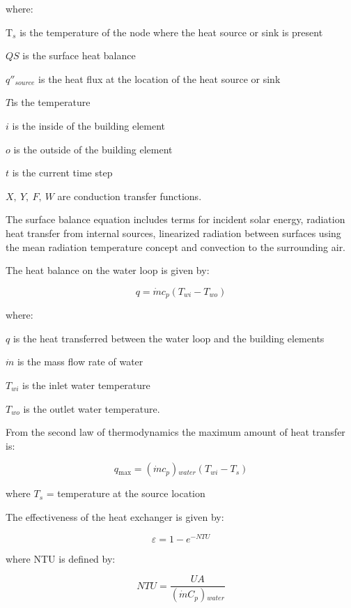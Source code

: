 where:

T\(_{s}\) is the temperature of the node where the heat source or sink is present

\(QS\) is the surface heat balance

\({q''_{source}}\) is the heat flux at the location of the heat source or sink

\(T\)is the temperature

\(i\) is the inside of the building element

\(o\) is the outside of the building element

\(t\) is the current time step

\(X,~Y,~F,~W\) are conduction transfer functions.

The surface balance equation includes terms for incident solar energy, radiation heat transfer from internal sources, linearized radiation between surfaces using the mean radiation temperature concept and convection to the surrounding air.

The heat balance on the water loop is given by:

\begin{equation}
q = \dot mc{}_p(T{}_{wi} - T{}_{wo})
\end{equation}

where:

\(q\) is the heat transferred between the water loop and the building elements

\(\dot m\) is the mass flow rate of water

\(T{}_{wi}\) is the inlet water temperature

\(T{}_{wo}\) is the outlet water temperature.

From the second law of thermodynamics the maximum amount of heat transfer is:

\begin{equation}
q{}_{\max } = (\dot mc{}_p){}_{water}(T{}_{wi} - T{}_s)
\end{equation}

where \(T_{s}\) = temperature at the source location

The effectiveness of the heat exchanger is given by:

\begin{equation}
\varepsilon  = 1 - {e^{ - NTU}}
\end{equation}

where NTU is defined by:

\begin{equation}
NTU = \frac{{UA}}{{(\dot mC{}_p){}_{water}}}
\end{equation}

